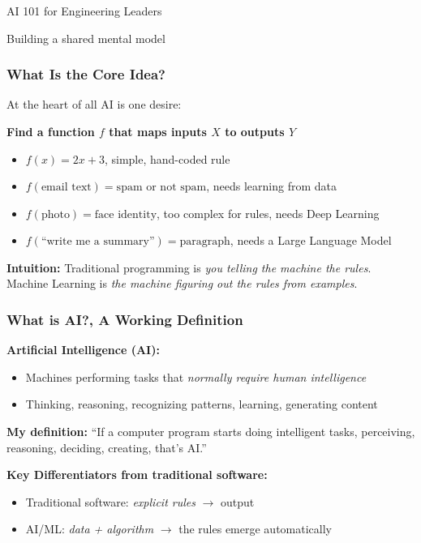 

\begin{frame}[fragile]\frametitle{}
\begin{center}
{\Large AI 101 for Engineering Leaders}

{\small Building a shared mental model}
\end{center}
\end{frame}

\begin{frame}[fragile]\frametitle{What Is the Core Idea?}
At the heart of all AI is one desire:
\begin{center}
\textbf{Find a function $f$ that maps inputs $X$ to outputs $Y$}
\end{center}
\begin{itemize}
\item $f(x) = 2x + 3$, simple, hand-coded rule
\item $f(\text{email text}) = \text{spam or not spam}$, needs learning from data
\item $f(\text{photo}) = \text{face identity}$, too complex for rules, needs Deep Learning
\item $f(\text{``write me a summary''}) = \text{paragraph}$, needs a Large Language Model
\end{itemize}
\textbf{Intuition:} Traditional programming is \textit{you telling the machine the rules}. Machine Learning is \textit{the machine figuring out the rules from examples}.
\end{frame}

\begin{frame}[fragile]\frametitle{What is AI?, A Working Definition}
\textbf{Artificial Intelligence (AI):}
\begin{itemize}
\item Machines performing tasks that \textit{normally require human intelligence}
\item Thinking, reasoning, recognizing patterns, learning, generating content
\end{itemize}

\textbf{My definition:} ``If a computer program starts doing intelligent tasks, perceiving, reasoning, deciding, creating, that's AI.''

\textbf{Key Differentiators from traditional software:}
\begin{itemize}
\item Traditional software: \textit{explicit rules} $\rightarrow$ output
\item AI/ML: \textit{data + algorithm} $\rightarrow$ the rules emerge automatically
\end{itemize}
\end{frame}

